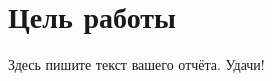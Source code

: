 \documentclass[a4paper, 14pt]{extarticle}
\begin{document}
	


\section{Цель работы}

Здесь пишите текст вашего отчёта. Удачи!
\end{document}
